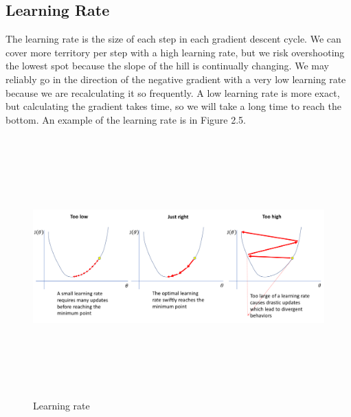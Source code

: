 \subsection{Learning Rate}
\label{subsec:learning_rate}
The learning rate is the size of each step in each gradient descent cycle. We can cover more territory per step with a high learning rate, but we risk overshooting the lowest spot because the slope of the hill is continually changing. We may reliably go in the direction of the negative gradient with a very low learning rate because we are recalculating it so frequently. A low learning rate is more exact, but calculating the gradient takes time, so we will take a long time to reach the bottom. An example of the learning rate is in Figure 2.5.
\newpage
\begin{figure}[!h]
	\centering
	\includegraphics[width=\linewidth, height=10cm,keepaspectratio]{figures/learning rate.png}
   \caption{Learning rate}
\end{figure}

